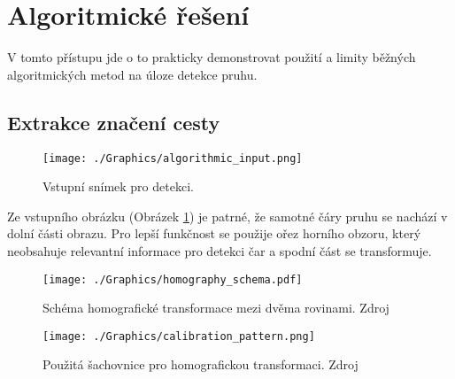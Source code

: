 \documentclass[czech, bc, kky, he, iso690numb]{fasthesis}
\begin{document}
        	
        \section{Algoritmické řešení}
        	V tomto přístupu jde o to prakticky demonstrovat použití a limity běžných algoritmických metod na úloze detekce pruhu.
            \subsection{Extrakce značení cesty}
            
	            	\begin{figure}[h]
	            		\centering
	            		\texttt{[image: ./Graphics/algorithmic\_input.png]}
	            		\caption{Vstupní snímek pro detekci.}
	            		\label{pic:algorithmic_input}
	            	\end{figure}
	            	
            	Ze vstupního obrázku (Obrázek \ref{pic:algorithmic_input}) je patrné, že samotné čáry pruhu se nachází v dolní části obrazu. Pro lepší funkčnost se použije ořez horního obzoru, který neobsahuje relevantní informace pro detekci čar a spodní část se transformuje.
            	
            		\begin{figure}[h]
            			\centering
            			\texttt{[image: ./Graphics/homography\_schema.pdf]}
            			\caption{Schéma homografické transformace mezi dvěma rovinami. Zdroj \cite[p.~385]{learning_opencv}}
            			\label{pic:homography_schema}
            		\end{figure}
            		
            		\begin{figure}[h]
            			\centering
            			\texttt{[image: ./Graphics/calibration\_pattern.png]}
            			\caption{Použitá šachovnice pro homografickou transformaci. Zdroj \cite{duckietown_documentation}}
            			\label{pic:calibration_pattern}
            		\end{figure}
            	
\end{document}
